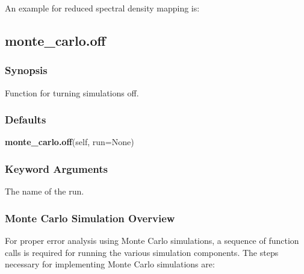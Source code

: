 


An example for reduced spectral density mapping  is:








\newpage

\subsection{monte\_carlo.off}


\subsubsection{Synopsis}

Function for turning simulations off.

\subsubsection{Defaults}

\textsf{\textbf{monte\_carlo.off}(self, run=None)}


\subsubsection{Keyword Arguments}


  The name of the run.


\subsubsection{Monte Carlo Simulation Overview}

For proper error analysis using Monte Carlo simulations, a sequence  of function calls is
required for running the various simulation components.  The steps necessary for
implementing Monte Carlo simulations are:

